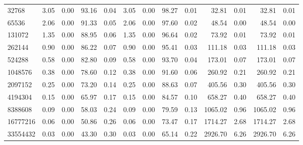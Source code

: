 \begin{tabular}{lrrrrrrrrrrrr}
32768      &        3.05 &        0.00 &         93.16 &          0.04 &           3.05 &           0.00 &        98.27 &         0.01 &            32.81 &             0.01 &           32.81 &            0.01 \\
65536      &        2.06 &        0.00 &         91.33 &          0.05 &           2.06 &           0.00 &        97.60 &         0.02 &            48.54 &             0.00 &           48.54 &            0.00 \\
131072     &        1.35 &        0.00 &         88.95 &          0.06 &           1.35 &           0.00 &        96.64 &         0.02 &            73.92 &             0.01 &           73.92 &            0.01 \\
262144     &        0.90 &        0.00 &         86.22 &          0.07 &           0.90 &           0.00 &        95.41 &         0.03 &           111.18 &             0.03 &          111.18 &            0.03 \\
524288     &        0.58 &        0.00 &         82.80 &          0.09 &           0.58 &           0.00 &        93.70 &         0.04 &           173.01 &             0.07 &          173.01 &            0.07 \\
1048576    &        0.38 &        0.00 &         78.60 &          0.12 &           0.38 &           0.00 &        91.60 &         0.06 &           260.92 &             0.21 &          260.92 &            0.21 \\
2097152    &        0.25 &        0.00 &         73.20 &          0.14 &           0.25 &           0.00 &        88.63 &         0.07 &           405.56 &             0.30 &          405.56 &            0.30 \\
4194304    &        0.15 &        0.00 &         65.97 &          0.17 &           0.15 &           0.00 &        84.57 &         0.10 &           658.27 &             0.40 &          658.27 &            0.40 \\
8388608    &        0.09 &        0.00 &         58.03 &          0.24 &           0.09 &           0.00 &        79.59 &         0.13 &          1065.02 &             0.96 &         1065.02 &            0.96 \\
16777216   &        0.06 &        0.00 &         50.86 &          0.26 &           0.06 &           0.00 &        73.47 &         0.17 &          1714.27 &             2.68 &         1714.27 &            2.68 \\
33554432   &        0.03 &        0.00 &         43.30 &          0.30 &           0.03 &           0.00 &        65.14 &         0.22 &          2926.70 &             6.26 &         2926.70 &            6.26 \\

\end{tabular}
